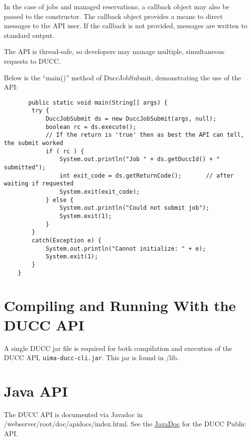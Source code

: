    In the case of jobs and managed reservations, a callback object may also be passed to
   the constructor.  The callback object provides a means to direct messages to the
   API user.  If the callback is not provided, messages are written to standard output.

   The API is thread-safe, so developers may manage multiple, simultaneous requests to
   DUCC.

   Below is the ``main()'' method of DuccJobSubmit, demonstrating the use of the API:
\begin{verbatim}   
       public static void main(String[] args) {
        try {
            DuccJobSubmit ds = new DuccJobSubmit(args, null);
            boolean rc = ds.execute();
            // If the return is 'true' then as best the API can tell, the submit worked
            if ( rc ) {                
                System.out.println("Job " + ds.getDuccId() + " submitted");
                int exit_code = ds.getReturnCode();       // after waiting if requested
                System.exit(exit_code);
            } else {
                System.out.println("Could not submit job");
                System.exit(1);
            }
        }
        catch(Exception e) {
            System.out.println("Cannot initialize: " + e);
            System.exit(1);
        }
    }
\end{verbatim}

\section{Compiling and Running With the DUCC API}

   A single DUCC jar file is required for both compilation and execution of the DUCC API,
   {\tt uima-ducc-cli.jar}.  This jar is found in \duccruntime/lib.

\section{Java API}
\ifpdf
   The DUCC API is documented via Javadoc in \ducchome/webserver/root/doc/apidocs/index.html.
\else
   See the \href{apidocs/index.html}{JavaDoc} for the DUCC Public API.
\fi
